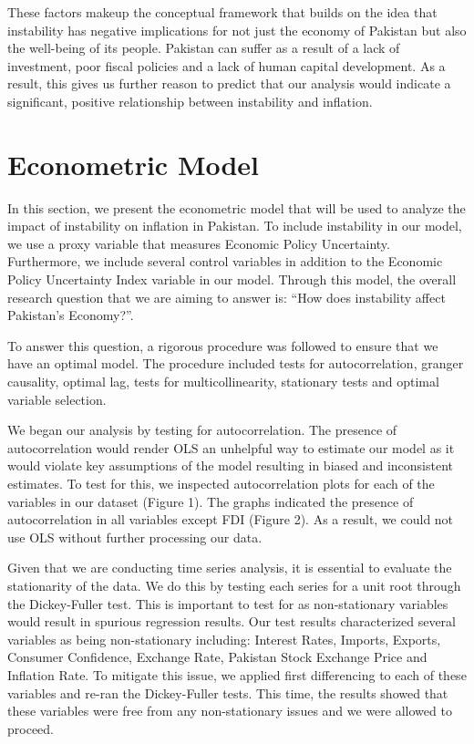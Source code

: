 \documentclass[11pt]{article}
\begin{document}
These factors makeup the conceptual framework that builds on the idea that instability has negative implications for not just the economy of Pakistan but also the well-being of its people. Pakistan can suffer as a result of a lack of investment, poor fiscal policies and a lack of human capital development. As a result, this gives us further reason to predict that our analysis would indicate a significant, positive relationship between instability and inflation. 

\section{Econometric Model}

In this section, we present the econometric model that will be used to analyze the impact of instability on inflation in Pakistan. To include instability in our model, we use a proxy variable that measures Economic Policy Uncertainty. Furthermore, we include several control variables in addition to the Economic Policy Uncertainty Index variable in our model. Through this model, the overall research question that we are aiming to answer is: “How does instability affect Pakistan’s Economy?”. \newline

To answer this question, a rigorous procedure was followed to ensure that we have an optimal model. The procedure included tests for autocorrelation, granger causality, optimal lag, tests for multicollinearity, stationary tests and optimal variable selection. \newline

We began our analysis by testing for autocorrelation. The presence of autocorrelation would render OLS an unhelpful way to estimate our model as it would violate key assumptions of the model resulting in biased and inconsistent estimates. To test for this, we inspected autocorrelation plots for each of the variables in our dataset (Figure 1). The graphs indicated the presence of autocorrelation in all variables except FDI (Figure 2). As a result, we could not use OLS without further processing our data.\newline

Given that we are conducting time series analysis, it is essential to evaluate the stationarity of the data. We do this by testing each series for a unit root through the Dickey-Fuller test. This is important to test for as non-stationary variables would result in spurious regression results. Our test results characterized several variables as being non-stationary including: Interest Rates, Imports, Exports, Consumer Confidence, Exchange Rate, Pakistan Stock Exchange Price and Inflation Rate. To mitigate this issue, we applied first differencing to each of these variables and re-ran the Dickey-Fuller tests. This time, the results showed that these variables were free from any non-stationary issues and we were allowed to proceed.\newline
\end{document}
